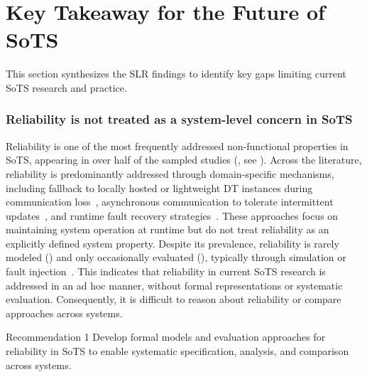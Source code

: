 \section{Key Takeaway for the Future of SoTS}\label{sec:literature-review-key-takeaways}
This section synthesizes the SLR findings to identify key gaps limiting current SoTS research and practice.

\subsubsection{Reliability is not treated as a system-level concern in SoTS}
Reliability is one of the most frequently addressed non-functional properties in SoTS, appearing in over half of the sampled studies (, see ). Across the literature, reliability is predominantly addressed through domain-specific mechanisms, including fallback to locally hosted or lightweight DT instances during communication loss~\cite{alam2017c2ps,larsen2024towards}, asynchronous communication to tolerate intermittent updates~\cite{acharya2023twins,liu2020web-based}, and runtime fault recovery strategies~\cite{esterle2021digital,villalonga2021decision-making}.  These approaches focus on maintaining system operation at runtime but do not treat reliability as an explicitly defined system property. Despite its prevalence, reliability is rarely modeled () and only occasionally evaluated (), typically through simulation or fault injection~\cite{park2020digital,saraeian2022digital}.  This indicates that reliability in current SoTS research is addressed in an ad hoc manner, without formal representations or systematic evaluation. Consequently, it is difficult to reason about reliability or compare approaches across systems.

\begin{recoframe}{Recommendation 1}
Develop formal models and evaluation approaches for reliability in SoTS to enable systematic specification, analysis, and comparison across systems.
\end{recoframe}

